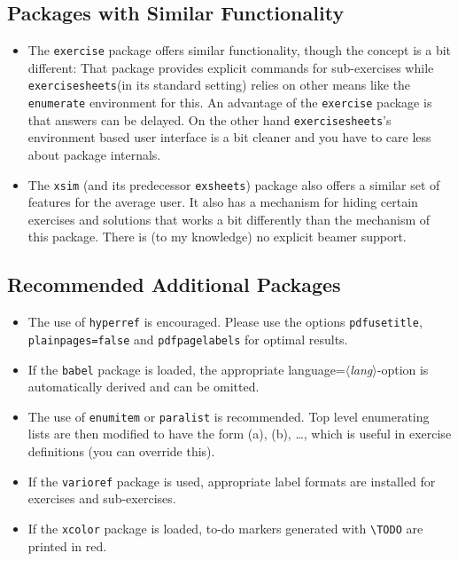 \documentclass[DIV12,BCOR0mm]{scrartcl}
\newcommand{\exsh}{\texttt{exercisesheets}\xspace}
\newcommand{\param}[1]{$\langle${\normalfont\itshape #1\/}$\rangle$}
\newcommand{\optionstyle}{\normalfont\ttfamily\color{red!50!black}}
\newcommand{\option}[1]{{\optionstyle #1}}
\begin{document}
\subsection{Packages with Similar Functionality}
\begin{itemize}
 \item The \texttt{exercise} package offers similar functionality, though the
  concept is a bit different: That package provides explicit commands for
  sub-exercises while \exsh (in its standard setting)
  relies on other means like the \texttt{enumerate}
  environment for this. An advantage of the \texttt{exercise} package is that
  answers can be delayed. On the other hand \exsh's environment based user
  interface is a bit cleaner and you have to care less about package internals.
  \item The \texttt{xsim} (and its predecessor \texttt{exsheets}) package also offers a similar set of features for the average user. It also has a mechanism for hiding certain exercises and solutions that works a bit differently than the mechanism of
  this package. There is (to my knowledge) no explicit beamer support.
\end{itemize}

\subsection{Recommended Additional Packages}
\begin{itemize}
 \item The use of \texttt{hyperref} is encouraged. Please use the options
  \texttt{pdfusetitle}, \texttt{plainpages=false} and \texttt{pdfpagelabels} for
  optimal results.
 \item If the \texttt{babel} package is loaded, the appropriate
  \option{language=\param{lang}}-option is automatically derived and can be
  omitted.
 \item The use of \texttt{enumitem} or \texttt{paralist} is recommended. Top
  level enumerating lists are then modified to have the form (a), (b), \dots{},
  which is useful in exercise definitions (you can override this).
 \item If the \texttt{varioref} package is used, appropriate label formats are
  installed for exercises and sub-exercises.
 \item If the \texttt{xcolor} package is loaded, to-do markers generated with
  \lstinline|\TODO| are printed in red.
\end{itemize}
\end{document}
